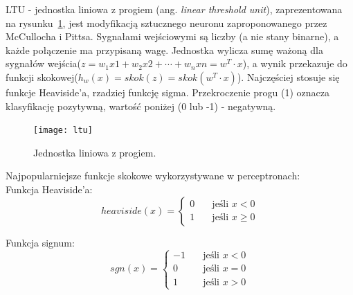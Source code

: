 \documentclass[a4paper,12pt]{article}
\numberwithin{figure}{section}
\begin{document}
    LTU - jednostka liniowa z progiem (ang. \textit{linear threshold unit}), zaprezentowana na rysunku~\ref{fig:ltu}, jest modyfikacją sztucznego neuronu zaproponowanego przez McCullocha i Pittsa. Sygnałami wejściowymi są liczby (a nie stany binarne), a każde połączenie ma przypisaną wagę. Jednostka wylicza sumę ważoną dla sygnałów wejścia($z=w_{1}x{1} + w_{2}x{2} + \cdots + w_{n}x{n} = w^{T} \cdot x$), a wynik przekazuje do funkcji skokowej($h_{w}(x) = skok(z) = skok(w^{T} \cdot x)$). Najczęściej stosuje się funkcje Heaviside'a, rzadziej funkcję sigma. Przekroczenie progu (1) oznacza klasyfikację pozytywną, wartość poniżej (0 lub -1) - negatywną\cite{UczenieMaszynowe2018}.

    \bigskip

    \begin{figure}[H]
        \centering
        \texttt{[image: ltu]}
        \caption{Jednostka liniowa z progiem\cite{UczenieMaszynowe2018}.}
        \label{fig:ltu}
    \end{figure}

    \bigskip

    \noindent
    \begin{minipage}[H]{\textwidth}
        \setlength\parindent{17pt} Najpopularniejsze funkcje skokowe wykorzystywane w perceptronach: \\
        \bigskip
        \setlength\parindent{17pt} Funkcja Heaviside'a: \\
        \begin{equation}
            \label{eq:heaviside}
            heaviside(x) =
            \begin{cases}
                0 & \quad \text{jeśli } x < 0 \\
                1 & \quad \text{jeśli } x \geq 0
            \end{cases}
        \end{equation}
    \end{minipage}

    \smallskip

    \noindent
    \begin{minipage}[H]{\textwidth}
        \setlength\parindent{17pt} Funkcja signum: \\
        \begin{equation}
            \label{eq:signum}
            sgn(x) =
            \begin{cases}
                -1 & \quad \text{jeśli } x < 0 \\
                0 & \quad \text{jeśli } x = 0 \\
                1 & \quad \text{jeśli } x > 0
            \end{cases}
        \end{equation}
    \end{minipage}
\end{document}
